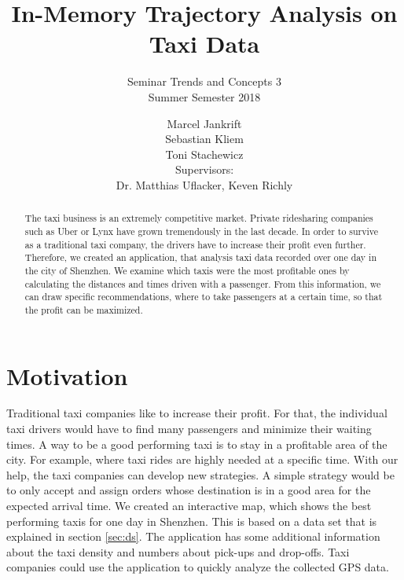 \documentclass[10pt]{sig-alternate}
\begin{document}

\title{
  \vspace{24pt}
  In-Memory Trajectory Analysis on Taxi Data
}
\subtitle{
  Seminar Trends and Concepts 3\\
  Summer Semester 2018
}


\author{
  Marcel Jankrift\\
  Sebastian Kliem\\
  Toni Stachewicz\\[12pt]
  Supervisors:\\
  Dr. Matthias Uflacker, Keven Richly
}

\maketitle
\begin{abstract}
The taxi business is an extremely competitive market. Private ridesharing companies such as Uber or Lynx have grown tremendously in the last decade. In order to survive as a traditional taxi company, the drivers have to increase their profit even further. Therefore, we created an application, that analysis taxi data recorded over one day in the city of Shenzhen. We examine which taxis were the most profitable ones by calculating the distances and times driven with a passenger. From this information, we can draw specific recommendations, where to take passengers at a certain time, so that the profit can be maximized.
\end{abstract}


\section{Motivation}

Traditional taxi companies like to increase their profit. For that, the individual taxi drivers would have to find many passengers and minimize their waiting times. A way to be a  good performing taxi is to stay in a profitable area of the city. For example, where taxi rides are highly needed at a specific time. With our help, the taxi companies can develop new strategies. A simple strategy would be to only accept and assign orders whose destination is in a good area for the expected arrival time. We created an interactive map, which shows the best performing taxis for one day in Shenzhen. This is based on a data set that is explained in section \ref{sec:ds}. The application has some additional information about the taxi density and numbers about pick-ups and drop-offs. Taxi companies could use the application to quickly analyze the collected GPS data.\\
\end{document}
